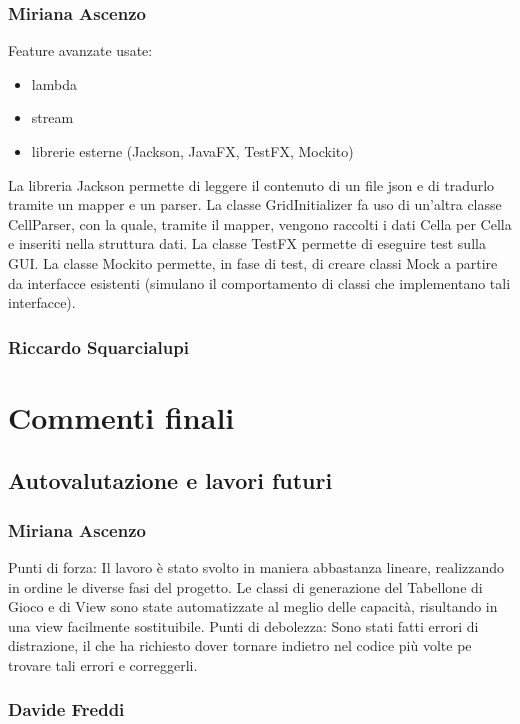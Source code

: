 \documentclass[a4paper,12pt]{report}
\begin{document}
	\subsection{Miriana Ascenzo}

	Feature avanzate usate:
	\begin{itemize}
		\item lambda
		\item stream
		\item librerie esterne (Jackson, JavaFX, TestFX, Mockito)
	\end {itemize}
	La libreria Jackson permette di leggere il contenuto di un file json e di tradurlo tramite un mapper e un parser.
	La classe GridInitializer fa uso di un’altra classe CellParser, con la quale, tramite il mapper, vengono raccolti i dati Cella per Cella e inseriti nella struttura dati.
	La classe TestFX permette di eseguire test sulla GUI.
	La classe Mockito permette, in fase di test, di creare classi Mock a partire da interfacce esistenti (simulano il comportamento di classi che implementano tali interfacce).

	\subsection{Riccardo Squarcialupi}

	\chapter{Commenti finali}

    \section{Autovalutazione e lavori futuri}

    \subsection{Miriana Ascenzo}
    Punti di forza:
    Il lavoro è stato svolto in maniera abbastanza lineare, realizzando in ordine le diverse fasi del progetto.
    Le classi di generazione del Tabellone di Gioco e di View sono state automatizzate al meglio delle capacità, risultando in una view facilmente sostituibile.
    Punti di debolezza:
    Sono stati fatti errori di distrazione, il che ha richiesto dover tornare indietro nel codice più volte pe trovare tali errori e correggerli.

    \subsection{Davide Freddi}
\end{document}
